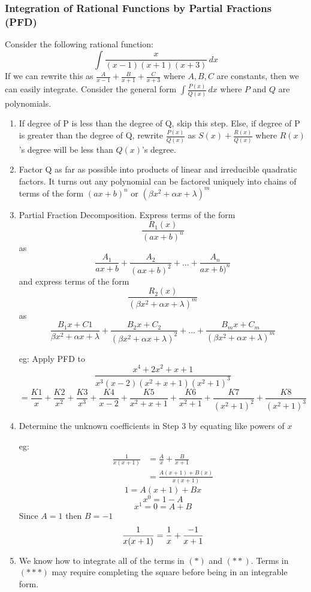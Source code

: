 \documentclass[english, 12pt]{article}
\begin{document}
\subsubsection{Integration of Rational Functions by Partial Fractions (PFD)}
Consider the following rational function:
\[ \int \frac{x}{(x-1)(x+1)(x+3)}\,dx \]
If we can rewrite this as $\frac{A}{x-1} + \frac{B}{x+1} + \frac{C}{x+3}$ where $A,B,C$ are constants, then we can easily integrate. Consider the general form $\int \frac{P(x)}{Q(x)} \,dx$ where $P$ and $Q$ are polynomials.
\begin{enumerate}
\item If degree of P is less than the degree of Q, skip this step. Else, if degree of P is greater than the degree of Q, rewrite $\frac{P(x)}{Q(x)}$ as $S(x) + \frac{R(x)}{Q(x)}$ where $R(x)$'s degree will be less than $Q(x)$'s degree.
\item Factor Q as far as possible into products of linear and irreducible quadratic factors. It turns out any polynomial can be factored uniquely into chains of terms of the form $(ax+b)^n$ or $(\beta x^2 + \alpha x + \lambda)^m$
\item Partial Fraction Decomposition. Express terms of the form 
\[\frac{R_{1}(x)}{(ax+b)^n}\]
 as
\[ \frac{A_{1}}{ax+b} + \frac{A_{2}}{(ax+b)^2} + ... + \frac{A_{n}}{ax+b)^n}\]
and express terms of the form \[\frac{R_{2}(x)}{(\beta x^2 + \alpha x + \lambda)^m}\]
as \[\frac{B_{1}x+C1}{\beta x^2 + \alpha x + \lambda} + \frac{B_{2}x+C_{2}}{(\beta x^2 + \alpha x + \lambda)^2} + ... + \frac{B_{m}x+C_{m}}{(\beta x^2 + \alpha x + \lambda)^m}\]

eg: Apply PFD to \[\frac{x^4+2x^2+x+1}{x^3(x-2)(x^2+x+1)(x^2+1)^3}\]
\[= \frac{K1}{x} + \frac{K2}{x^2} + \frac{K3}{x^3} + \frac{K4}{x-2} + \frac{K5}{x^2+x+1} + \frac{K6}{x^2+1} +  \frac{K7}{(x^2+1)^2} + \frac{K8}{(x^2+1)^3}  \]
\item Determine the unknown coefficients in Step 3 by equating like powers of $x$

eg: 
\begin{align*}
\frac{1}{x(x+1)} &= \frac{A}{x} + \frac{B}{x+1}\\
&= \frac{A(x+1)+B(x)}{x(x+1)}
\end{align*}
\[1=A(x+1)+Bx\]
\[x^0 = 1 - A\]
\[x^1 = 0 = A+B\]
Since $A=1$ then $B=-1$
\[ \frac{1}{x(x+1)} = \frac{1}{x} + \frac{-1}{x+1} \]
\item We know how to integrate all of the terms in $(*)$ and $(**)$. Terms in $(***)$ may require completing the square before being in an integrable form.
\end{enumerate}
\end{document}
